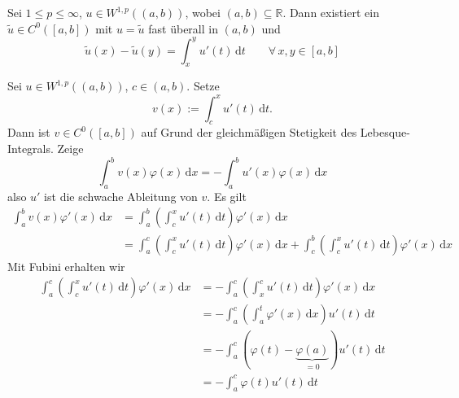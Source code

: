 \begin{satz}
	Sei $1 \leq p \leq \infty$, $u \in W^{1,p}((a,b))$, wobei $(a,b) \subseteq \mathbb{R}$. Dann existiert ein $\tilde u \in C^0([a,b])$ mit $u = \tilde u$ fast überall in $(a,b)$ und 
	\[
		\tilde u(x) - \tilde u(y) = \int_{x}^{y}u'(t) \,\mathrm{d}t \qquad \forall\, x,y \in [a,b]
	\]
\end{satz}
\begin{beweis}
	Sei $u \in W^{1,p}((a,b))$, $c \in (a,b)$. Setze
	\[
		v(x):= \int_{c}^{x}u'(t) \,\mathrm{d}t.
	\]
	Dann ist $v \in C^0([a,b])$ auf Grund der gleichmäßigen Stetigkeit des Lebesque-Integrals. Zeige
	\[
		\int_{a}^{b} v(x) \varphi(x) \,\mathrm{d}x = - \int_{a}^{b}u'(x) \varphi(x) \,\mathrm{d}x
	\]
	also $u'$ ist die schwache Ableitung von $v$. Es gilt
	\begin{align*}
		\int_{a}^{b}v(x) \varphi'(x) \,\mathrm{d}x &= \int_{a}^{b} \left( \int_{c}^{x} u'(t) \,\mathrm{d}t \right) \varphi'(x) \,\mathrm{d}x \\
		&= \int_{a}^{c} \left( \int_{c}^{x} u'(t) \,\mathrm{d}t \right) \varphi'(x) \,\mathrm{d}x + \int_{c}^{b} \left( \int_{c}^{x} u'(t) \,\mathrm{d}t \right) \varphi'(x) \,\mathrm{d}x
	\end{align*}
	Mit Fubini erhalten wir
	\begin{align*}
		\int_{a}^{c} \left( \int_{c}^{x}u'(t) \,\mathrm{d}t \right) \varphi'(x) \,\mathrm{d}x &= - \int_{a}^{c}\left( \int_{x}^{c}u'(t) \,\mathrm{d}t \right) \varphi'(x) \,\mathrm{d}x \\ 
		&= - \int_{a}^{c} \left( \int_{a}^{t} \varphi'(x) \,\mathrm{d}x \right)u'(t) \,\mathrm{d}t \\
		&= - \int_{a}^{c} \left( \varphi(t) - \underset{=0}{\underbrace{\varphi(a)}} \right) u'(t) \,\mathrm{d}t \\
		&= - \int_{a}^{c} \varphi(t) u'(t) \,\mathrm{d}t
	\end{align*}
\end{beweis}
\cleardoubleoddemptypage
{}
\setcounter{page}{1}

